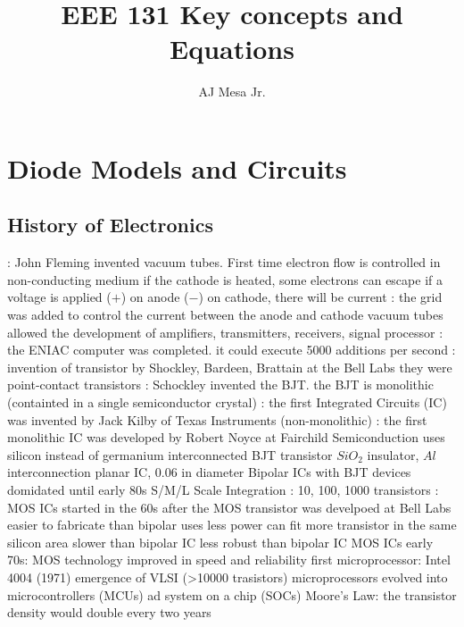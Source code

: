 \documentclass[a4paper,11pt]{article}
\title{\textbf{EEE 131 Key concepts and Equations}}
\author{AJ Mesa Jr.}
\begin{document}
	\maketitle
	\section{Diode Models and Circuits}
	\subsection{History of Electronics}
	\begin{outline}[enumerate]
		: John Fleming invented vacuum tubes. First time electron flow is controlled in non-conducting medium
			\2 if the cathode is heated, some electrons can escape 
			\2 if a voltage is applied ($+$) on anode ($-$) on cathode, there will be current 
		: the grid was added to control the current between the anode and cathode
			\2 vacuum tubes allowed the development of amplifiers, transmitters, receivers, signal processor
		: the ENIAC computer was completed. it could execute 5000 additions per second
		: invention of transistor by Shockley, Bardeen, Brattain at the Bell Labs
			\2 they were point-contact transistors
		: Schockley invented the BJT. the BJT is monolithic (containted in a single semiconductor crystal)	
		: the first Integrated Circuits (IC) was invented by Jack Kilby of Texas Instruments (non-monolithic) 
		: the first monolithic IC was developed by Robert Noyce at Fairchild Semiconduction
			\2 uses silicon instead of germanium
			 interconnected BJT transistor
			\2 $SiO_{2}$ insulator, $Al$ interconnection
			\2 planar IC, 0.06 in diameter
		\1 Bipolar ICs with BJT devices domidated until early 80s	
			\2 S/M/L Scale Integration : 10, 100, 1000 transistors
		: MOS ICs started in the 60s after the MOS transistor was develpoed at Bell Labs
			\2 easier to fabricate than bipolar 
			\2 uses less power
			\2 can fit more transistor in the same silicon area
			\2 slower than bipolar IC
			\2 less robust than bipolar IC
		\1 MOS ICs
			\2 early 70s: MOS technology improved in speed and reliability
			\2 first microprocessor: Intel 4004 (1971)
			\2 emergence of VLSI (>10000 trasistors)
			\2 microprocessors evolved into microcontrollers (MCUs) ad system on a chip (SOCs)
		\1 Moore's Law: the transistor density would double every two years
	\end{outline}
\end{document}
